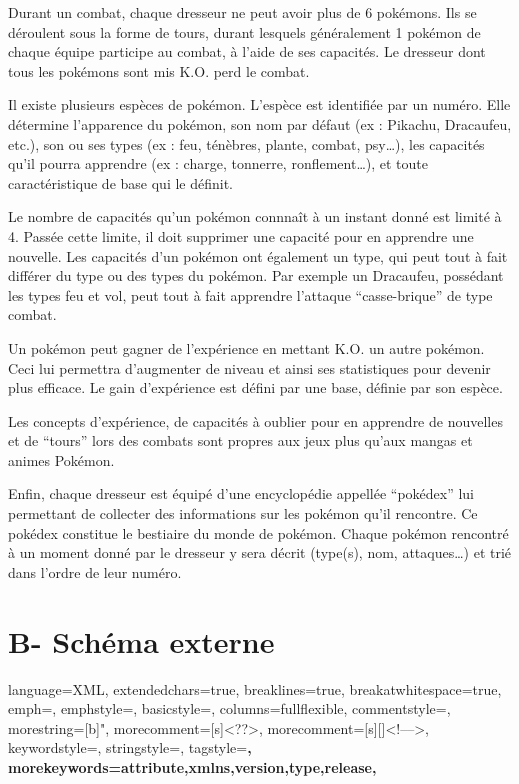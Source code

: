 Durant un combat, chaque dresseur ne peut avoir plus de 6 pokémons. Ils se déroulent sous la forme de tours, durant lesquels généralement 1 pokémon de chaque équipe participe au combat, à l’aide de ses capacités. Le dresseur dont tous les pokémons sont mis K.O. perd le combat.

Il existe plusieurs espèces de pokémon. L’espèce est identifiée par un numéro. Elle détermine l’apparence du pokémon, son nom par défaut (ex : Pikachu, Dracaufeu, etc.), son ou ses types (ex : feu, ténèbres, plante, combat, psy…), les capacités qu’il pourra apprendre (ex : charge, tonnerre, ronflement…), et toute caractéristique de base qui le définit.

Le nombre de capacités qu’un pokémon connnaît à un instant donné est limité à 4. Passée cette limite, il doit supprimer une capacité pour en apprendre une nouvelle. Les capacités d’un pokémon ont également un type, qui peut tout à fait différer du type ou des types du pokémon. Par exemple un Dracaufeu, possédant les types feu et vol, peut tout à fait apprendre l’attaque “casse-brique” de type combat.

Un pokémon peut gagner de l’expérience en mettant K.O. un autre pokémon. Ceci lui permettra d’augmenter de niveau et ainsi ses statistiques pour devenir plus efficace. Le gain d’expérience est défini par une base, définie par son espèce.

Les concepts d’expérience, de capacités à oublier pour en apprendre de nouvelles et de “tours” lors des combats sont propres aux jeux plus qu’aux mangas et animes Pokémon.

Enfin, chaque dresseur est équipé d’une encyclopédie appellée “pokédex” lui permettant de collecter des informations sur les pokémon qu’il rencontre. Ce pokédex constitue le bestiaire du monde de pokémon. Chaque pokémon rencontré à un moment donné par le dresseur y sera décrit (type(s), nom, attaques…) et trié dans l’ordre de leur numéro.

\section{B- Schéma externe}

\usepackage{listings, color}


 {
   language=XML,
   extendedchars=true, 
   breaklines=true,
   breakatwhitespace=true,
   emph={},
   emphstyle=\color{red},
   basicstyle=\ttfamily,
   columns=fullflexible,
   commentstyle=\color{gray}\upshape,
   morestring=[b]",
   morecomment=[s]{<?}{?>},
   morecomment=[s][\color{forestgreen}]{<!--}{-->},
   keywordstyle=\color{orangered},
   stringstyle=\ttfamily\color{black}\normalfont,
   tagstyle=\color{darkblue}\bf,
   morekeywords={attribute,xmlns,version,type,release},
}

